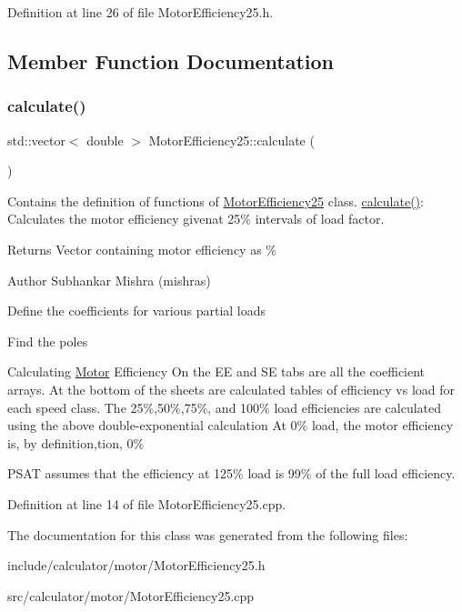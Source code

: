 Definition at line 26 of file Motor\+Efficiency25.\+h.



\subsection{Member Function Documentation}
\mbox{\label{class_motor_efficiency25_a2421a96d011677172f43d9929b250188}} 
\subsubsection{\texorpdfstring{calculate()}{calculate()}}
{\footnotesize\ttfamily std\+::vector$<$ double $>$ Motor\+Efficiency25\+::calculate (\begin{DoxyParamCaption}{ }\end{DoxyParamCaption})}



Contains the definition of functions of \hyperlink{class_motor_efficiency25}{Motor\+Efficiency25} class. \hyperlink{class_motor_efficiency25_a2421a96d011677172f43d9929b250188}{calculate()}\+: Calculates the motor efficiency givenat 25\% intervals of load factor. 

\begin{DoxyReturn}{Returns}
Vector containing motor efficiency as \%
\end{DoxyReturn}
\begin{DoxyAuthor}{Author}
Subhankar Mishra (mishras) 
\end{DoxyAuthor}
Define the coefficients for various partial loads

Find the poles

Calculating \hyperlink{class_motor}{Motor} Efficiency On the EE and SE tabs are all the coefficient arrays. At the bottom of the sheets are calculated tables of efficiency vs load for each speed class. The 25\%,50\%,75\%, and 100\% load efficiencies are calculated using the above double-\/exponential calculation At 0\% load, the motor efficiency is, by definition,tion, 0\%

P\+S\+AT assumes that the efficiency at 125\% load is 99\% of the full load efficiency.

Definition at line 14 of file Motor\+Efficiency25.\+cpp.



The documentation for this class was generated from the following files\+:\begin{DoxyCompactItemize}
\item 
include/calculator/motor/Motor\+Efficiency25.\+h\item 
src/calculator/motor/Motor\+Efficiency25.\+cpp\end{DoxyCompactItemize}
